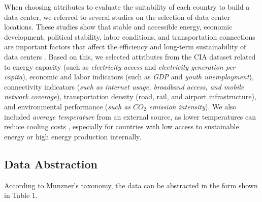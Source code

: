 \documentclass{vgtc}                          %
\newcommand{\mycomment}[1]{}
\begin{document}
When choosing attributes to evaluate the suitability of each country to build a data center, we referred to several studies on the selection of data center locations. These studies show that stable and accessible energy, economic development, political stability, labor conditions, and transportation connections are important factors that affect the efficiency and long-term sustainability of data centers \cite{kheybari2020sustainable} \cite{murino2023sustainable} \cite{Turek2021DataCenter}. Based on this, we selected attributes from the CIA dataset related to energy capacity (such as \textit{electricity access} and \textit{electricity generation per capita}), economic and labor indicators (such as \textit{GDP} and \textit{youth unemployment}), connectivity indicators (\textit{such as \textit{internet usage}, \textit{broadband access}, and mobile network coverage}), transportation density (road, rail, and airport infrastructure), and environmental performance (\textit{such as $CO_2$ emission intensity}). We also included \textit{average temperature} from an external source\cite{temp}, as lower temperatures can reduce cooling costs \cite{murino2023sustainable}, especially for countries with low access to sustainable energy or high energy production internally.

\mycomment{
**how do these attributes help investors to reach their goal? 
Due to lit research? or did we already answer this if not, a little in depth

**why is this enough information to answer all your users questions?
There is no exhaustive list as to what investors look for for building datacenters, However via literature research we have taken the predominant factors into the account that are also available in the CIA dataset, .
}

 

\subsection{Data Abstraction}
According to Munzner’s taxonomy, the data can be abstracted in the form shown in Table 1.
\end{document}
